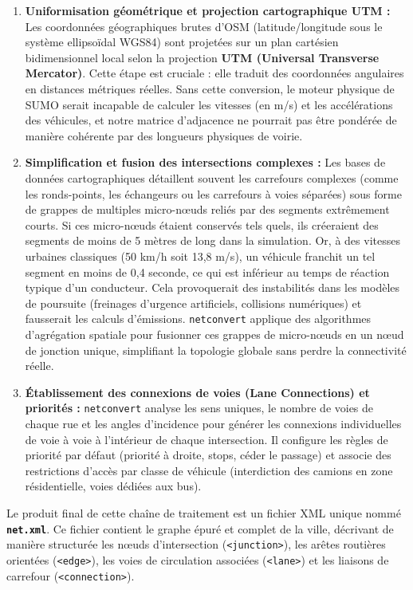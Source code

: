 \documentclass[10pt, a4paper]{article}
\providecommand{\tightlist}{}
\begin{document}
\begin{enumerate}
\def\labelenumi{\arabic{enumi}.}
\tightlist
\item
  \textbf{Uniformisation géométrique et projection cartographique UTM :}
  Les coordonnées géographiques brutes d'OSM (latitude/longitude sous le
  système ellipsoïdal WGS84) sont projetées sur un plan cartésien
  bidimensionnel local selon la projection \textbf{UTM (Universal
  Transverse Mercator)}. Cette étape est cruciale : elle traduit des
  coordonnées angulaires en distances métriques réelles. Sans cette
  conversion, le moteur physique de SUMO serait incapable de calculer
  les vitesses (en m/s) et les accélérations des véhicules, et notre
  matrice d'adjacence ne pourrait pas être pondérée de manière cohérente
  par des longueurs physiques de voirie.
\item
  \textbf{Simplification et fusion des intersections complexes :} Les
  bases de données cartographiques détaillent souvent les carrefours
  complexes (comme les ronds-points, les échangeurs ou les carrefours à
  voies séparées) sous forme de grappes de multiples micro-nœuds reliés
  par des segments extrêmement courts. Si ces micro-nœuds étaient
  conservés tels quels, ils créeraient des segments de moins de 5 mètres
  de long dans la simulation. Or, à des vitesses urbaines classiques (50
  km/h soit 13,8 m/s), un véhicule franchit un tel segment en moins de
  0,4 seconde, ce qui est inférieur au temps de réaction typique d'un
  conducteur. Cela provoquerait des instabilités dans les modèles de
  poursuite (freinages d'urgence artificiels, collisions numériques) et
  fausserait les calculs d'émissions. \texttt{netconvert} applique des
  algorithmes d'agrégation spatiale pour fusionner ces grappes de
  micro-nœuds en un nœud de jonction unique, simplifiant la topologie
  globale sans perdre la connectivité réelle.
\item
  \textbf{Établissement des connexions de voies (Lane Connections) et
  priorités :} \texttt{netconvert} analyse les sens uniques, le nombre
  de voies de chaque rue et les angles d'incidence pour générer les
  connexions individuelles de voie à voie à l'intérieur de chaque
  intersection. Il configure les règles de priorité par défaut (priorité
  à droite, stops, céder le passage) et associe des restrictions d'accès
  par classe de véhicule (interdiction des camions en zone
  résidentielle, voies dédiées aux bus).
\end{enumerate}

Le produit final de cette chaîne de traitement est un fichier XML unique
nommé \textbf{\texttt{net.xml}}. Ce fichier contient le graphe épuré et
complet de la ville, décrivant de manière structurée les nœuds
d'intersection (\texttt{\textless{}junction\textgreater{}}), les arêtes
routières orientées (\texttt{\textless{}edge\textgreater{}}), les voies
de circulation associées (\texttt{\textless{}lane\textgreater{}}) et les
liaisons de carrefour (\texttt{\textless{}connection\textgreater{}}).
\end{document}
